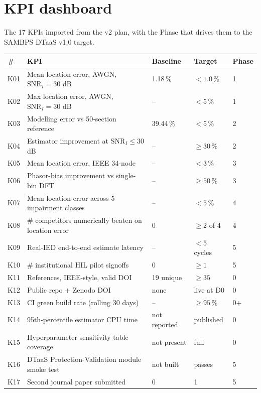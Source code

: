 \documentclass[11pt,a4paper]{article}
\begin{document}
\section{KPI dashboard}

The 17 KPIs imported from the v2 plan, with the Phase that drives them
to the SAMBPS DTaaS v1.0 target.

\renewcommand{\arraystretch}{1.18}
\begin{longtable}{L{0.7cm}L{6.6cm}L{2.4cm}L{2.4cm}L{1.4cm}}
\toprule{}
\textbf{\#} & \textbf{KPI} & \textbf{Baseline} & \textbf{Target} & \textbf{Phase}\\\midrule\endhead
K01 & Mean location error, AWGN, $\mathrm{SNR}_I=30$ dB & 1.18\,\%             & $<1.0$\,\%  & 1\\
K02 & Max location error, AWGN, $\mathrm{SNR}_I=30$ dB  & --                   & $<5$\,\%    & 1\\
K03 & Modelling error vs 50-section reference           & 39.44\,\%            & $<5$\,\%    & 2\\
K04 & Estimator improvement at $\mathrm{SNR}_I\le 30$ dB & --                  & $\geq 30$\,\% & 2\\
K05 & Mean location error, IEEE 34-node                 & --                   & $<3$\,\%    & 3\\
K06 & Phasor-bias improvement vs single-bin DFT         & --                   & $\geq 50$\,\% & 3\\
K07 & Mean location error across 5 impairment classes   & --                   & $<5$\,\%    & 4\\
K08 & \# competitors numerically beaten on location error & 0                  & $\geq 2$ of 4 & 4\\
K09 & Real-IED end-to-end estimate latency              & --                   & $<5$ cycles & 5\\
K10 & \# institutional HIL pilot signoffs               & 0                    & $\geq 1$    & 5\\
K11 & References, IEEE-style, valid DOI                 & 19 unique            & $\geq 35$   & 0\\
K12 & Public repo + Zenodo DOI                          & none                 & live at D0  & 0\\
K13 & CI green build rate (rolling 30 days)             & --                   & $\geq 95$\,\% & 0+\\
K14 & 95th-percentile estimator CPU time                & not reported         & published   & 0\\
K15 & Hyperparameter sensitivity table coverage         & not present          & full        & 0\\
K16 & DTaaS Protection-Validation module smoke test     & not built            & passes      & 5\\
K17 & Second journal paper submitted                    & 0                    & 1           & 5\\
\bottomrule
\end{longtable}
\end{document}
